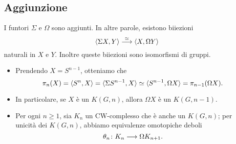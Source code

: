 \subsection*{Aggiunzione}
\begin{frame*}
\begin{proposition}
I funtori $\Sigma$ e $\Omega$ sono aggiunti. In altre parole, esistono biiezioni
\[
\umap[\iso]{\hmaps{\Sigma X,Y}}{\hmaps{X,\Omega Y}}
\]
naturali in $X$ e $Y$. Inoltre queste biiezioni sono isomorfismi di gruppi.
\end{proposition}
\begin{itemize}
\item Prendendo $X=S^{n-1}$, otteniamo che
\[
\pi_n(X)=\langle S^n,X\rangle=\langle \Sigma S^{n-1},X\rangle\simeq\langle S^{n-1},\Omega X\rangle=\pi_{n-1}(\Omega X).
\]
\item In particolare, se $X$ è un $K(G,n)$, allora $\Omega X$ è un $K(G,n-1)$.
\item Per ogni $n\ge 1$, sia $K_n$ un CW-complesso che è anche un $K(G,n)$; per unicità dei $K(G,n)$, abbiamo equivalenze omotopiche deboli
\[
\map{\theta_n}{K_n}{\Omega K_{n+1}}.
\]
\end{itemize}
\end{frame*}